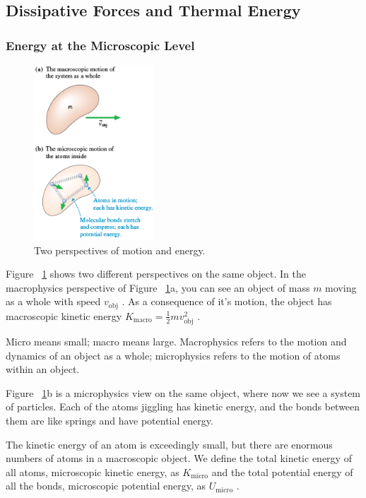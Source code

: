 \subsection{Dissipative Forces and Thermal Energy}

\subsubsection{Energy at the Microscopic Level}

\begin{figure}
    \centering
    \includegraphics[width=0.4\textwidth]{../figures/micro-vs-macro.png}
    \caption{Two perspectives of motion and energy.}%
    \label{fig:micro-vs-macro}
\end{figure}

Figure~%
\ref{fig:micro-vs-macro} shows two different perspectives on the same
object.  In the macrophysics perspective of Figure~%
\ref{fig:micro-vs-macro}a, you can see an object of mass
$
    m
$ moving as a whole with speed
$
    v_\mathrm{obj}
$%
.  As a consequence of it's motion, the object has macroscopic kinetic
energy
$
    K_\mathrm{macro} = \frac{1}{2}mv_\mathrm{obj}^2
$%
.
\begin{remark}
    Micro means small; macro means large.  Macrophysics refers to the
    motion and dynamics of an object as a whole; microphysics refers to
    the motion of atoms within an object.
\end{remark}
Figure~%
\ref{fig:micro-vs-macro}b is a microphysics view on the same object,
where now we see a system of particles.  Each of the atoms jiggling has
kinetic energy, and the bonds between them are like springs and have
potential energy.

The kinetic energy of an atom is exceedingly small, but there are
enormous numbers of atoms in a macroscopic object.  We define the total
kinetic energy of all atoms, microscopic kinetic energy, as
$
    K_\mathrm{micro}
$ and the total potential energy of all the bonds, microscopic potential
energy, as
$
    U_\mathrm{micro}
$%
.


